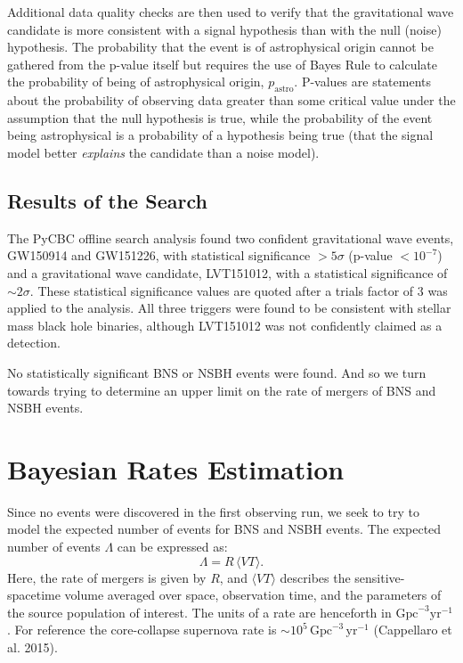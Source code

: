 Additional data quality checks are then used to verify that the gravitational wave candidate is more consistent with a signal hypothesis than with the null (noise) hypothesis. The probability that the event is of astrophysical origin cannot be gathered from the p-value itself but requires the use of Bayes Rule to calculate the probability of being of astrophysical origin, $p_\mathrm{astro}$. P-values are statements about the probability of observing data greater than some critical value under the assumption that the null hypothesis is true, while the probability of the event being astrophysical is a probability of a hypothesis being true (that the signal model better \textit{explains} the candidate than a noise model).

\subsection{Results of the Search}


The PyCBC offline search analysis found two confident gravitational wave events, GW150914 and GW151226, with statistical significance $> 5 \sigma$ (p-value $<  10^{-7}$) and a gravitational wave candidate, LVT151012, with a statistical significance of $\sim 2\sigma$. These statistical significance values are quoted after a trials factor of $3$ was applied to the analysis. All three triggers were found to be consistent with stellar mass black hole binaries, although LVT151012 was not confidently claimed as a detection.

No statistically significant BNS or NSBH events were found. And so we turn towards trying to determine an upper limit on the rate of mergers of BNS and NSBH events.

\section{Bayesian Rates Estimation}
Since no events were discovered in the first observing run, we seek to try to model the expected number of events for BNS and NSBH events. The expected number of events $\Lambda$ can be expressed as:
\begin{equation}
    \Lambda = R \, \langle VT\rangle.
\end{equation}
Here, the rate of mergers is given by $R$, and $\langle VT\rangle$ describes the sensitive-spacetime volume averaged over space, observation time, and the parameters of the source population of interest. The units of a rate are henceforth in $\mathrm{Gpc}^{-3} \mathrm{yr}^{-1}$. For reference the core-collapse supernova rate is $\sim 10^5 \, \mathrm{Gpc}^{-3} \, \mathrm{yr}^{-1}$ (Cappellaro et al. 2015).

